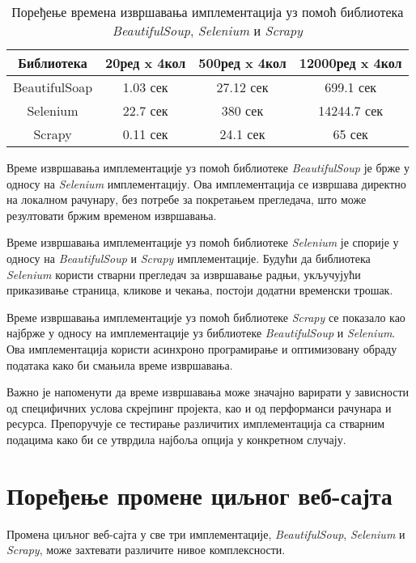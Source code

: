 \documentclass[12pt,oneside]{memoir}
\begin{document}
\begin{table}[htbp]
\centering
\caption{Поређење времена извршавања имплементација уз помоћ библиотека \textit{BeautifulSoup}, \textit{Selenium} и \textit{Scrapy}}
\label{tab:poredjenjeVremena}
\begin{tabular}{ |c|c|c|c| } 
\hline
\textbf{Библиотека} & \textbf{20ред x 4кол} & \textbf{500ред x 4кол} & \textbf{12000ред x 4кол} \\

\hline
\multirow{1}{6em}{BeautifulSoap} & 1.03 сек  & 27.12 сек & 699.1 сек\\ 

\hline
\multirow{1}{6em}{Selenium} & 22.7 сек & 380 сек & 14244.7 сек\\ 

\hline
\multirow{1}{6em}{Scrapy} & 0.11 сек & 24.1 сек & 65 сек \\ 

\hline
\end{tabular}
\end{table}

Време извршавања имплементације уз помоћ библиотеке \textit{BeautifulSoup} је брже у односу на \textit{Selenium} имплементацију. Ова имплементација се извршава директно на локалном рачунару, без потребе за покретањем прегледача, што може резултовати бржим временом извршавања.

Време извршавања имплементације  уз помоћ библиотеке \textit{Selenium} је спорије у односу на \textit{BeautifulSoup} и \textit{Scrapy} имплементације. Будући да библиотека \textit{Selenium} користи стварни прегледач за извршавање радњи, укључујући приказивање страница, кликове и чекања, постоји додатни временски трошак.

Време извршавања имплементације уз помоћ библиотеке \textit{Scrapy} се показало као најбрже у односу на имплементације уз библиотеке \textit{BeautifulSoup} и \textit{Selenium}. Ова имплементација користи асинхроно програмирање и оптимизовану обраду података како би смањила време извршавања.

Важно је напоменути да време извршавања може значајно варирати у зависности од специфичних услова скрејпинг пројекта, као и од перформанси рачунара и ресурса. Препоручује се тестирање различитих имплементација са стварним подацима како би се утврдила најбоља опција у конкретном случају.

\section{Поређење промене циљног веб-сајта}
Промена циљног веб-сајта у све три имплементације, \textit{BeautifulSoup}, \textit{Selenium} и \textit{Scrapy}, може захтевати различите нивое комплексности.
\end{document}
